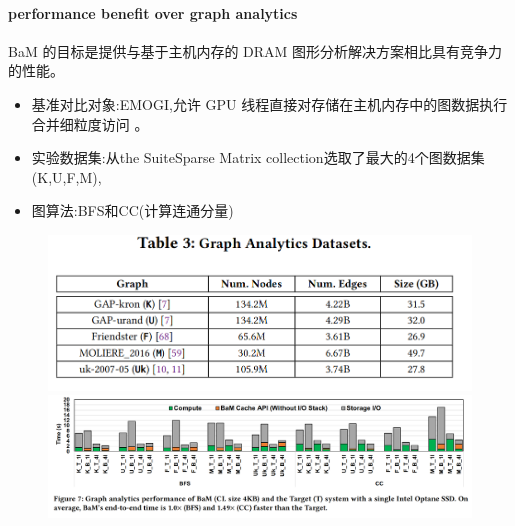\documentclass[10pt]{ctexbeamer}
\begin{document}
\begin{frame}
  \framesubtitle{performance benefit over graph analytics}
  BaM 的目标是提供与基于主机内存的 DRAM 图形分析解决方案相比具有竞争力的性能。
  \begin{itemize}
    \item 基准对比对象:EMOGI,允许 GPU 线程直接对存储在主机内存中的图数据执行合并细粒度访问 \cite{min2020emogi}。
    \item 实验数据集:从the SuiteSparse Matrix collection选取了最大的4个图数据集(K,U,F,M),
    \item 图算法:BFS和CC(计算连通分量)
  \end{itemize}
  \begin{figure}
    \includegraphics[width=.3\textwidth,height=.2\textheight]{images/dataset.png}
    \includegraphics[width=.65\textwidth,height=.3\textheight]{images/graph_analysics.png}
  \end{figure}

\end{frame}
\end{document}
